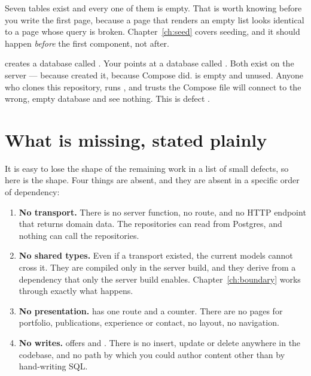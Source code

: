 Seven tables exist and every one of them is empty. That is worth knowing before you write the
first page, because a page that renders an empty list looks identical to a page whose query is
broken. Chapter~\ref{ch:seed} covers seeding, and it should happen \emph{before} the first
component, not after.

\begin{pitfall}
 creates a database called . Your  points
 at a database called . Both exist on the server --- 
because  created it,  because Compose did. 
is empty and unused. Anyone who clones this repository, runs , and trusts
the Compose file will connect to the wrong, empty database and see nothing. This is
defect .
\end{pitfall}

\section{What is missing, stated plainly}

It is easy to lose the shape of the remaining work in a list of small defects, so here is the
shape. Four things are absent, and they are absent in a specific order of dependency:

\begin{enumerate}
  \item \textbf{No transport.} There is no server function, no route, and no HTTP endpoint that
    returns domain data. The repositories can read from Postgres, and nothing can call the
    repositories.
  \item \textbf{No shared types.} Even if a transport existed, the current models cannot cross
    it. They are compiled only in the server build, and they derive  from a
    dependency that only the server build enables. Chapter~\ref{ch:boundary} works through
    exactly what happens.
  \item \textbf{No presentation.}  has one route and a counter. There are no
    pages for portfolio, publications, experience or contact, no layout, no navigation.
  \item \textbf{No writes.}  offers  and .
    There is no insert, update or delete anywhere in the codebase, and no path by which you could
    author content other than by hand-writing SQL.
\end{enumerate}

